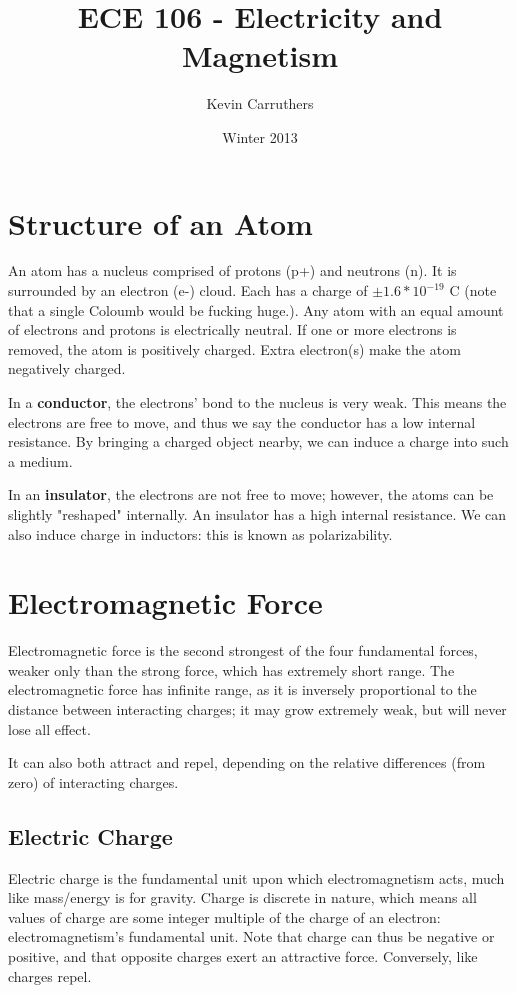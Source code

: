 \documentclass[12pt]{article}
\begin{document}
\title{ECE 106 - Electricity and Magnetism}
\author{Kevin Carruthers}
\date{\vspace{-2ex}Winter 2013}
\maketitle\HRule

\section*{Structure of an Atom}
An atom has a nucleus comprised of protons (p+) and neutrons (n). It is surrounded by an electron (e-) cloud. Each has a charge of $\pm 1.6*10^{-19}$ C (note that a single Coloumb would be fucking huge.). Any atom with an equal amount of electrons and protons is electrically neutral. If one or more electrons is removed, the atom is positively charged. Extra electron(s) make the atom negatively charged. 

In a {\bf conductor}, the electrons' bond to the nucleus is very weak. This means the electrons are free to move, and thus we say the conductor has a low internal resistance. By bringing a charged object nearby, we can induce a charge into such a medium.

In an {\bf insulator}, the electrons are not free to move; however, the atoms can be slightly "reshaped" internally. An insulator has a high internal resistance. We can also induce charge in inductors: this is known as polarizability.

\section*{Electromagnetic Force}
Electromagnetic force is the second strongest of the four fundamental forces, weaker only than the strong force, which has extremely short range. The electromagnetic force has infinite range, as it is inversely proportional to the distance between interacting charges; it may grow extremely weak, but will never lose all effect.

It can also both attract and repel, depending on the relative differences (from zero) of interacting charges.

\subsection*{Electric Charge}
Electric charge is the fundamental unit upon which electromagnetism acts, much like mass/energy is for gravity. Charge is discrete in nature, which means all values of charge are some integer multiple of the charge of an electron: electromagnetism's fundamental unit. Note that charge can thus be negative or positive, and that opposite charges exert an attractive force. Conversely, like charges repel.
\end{document}
